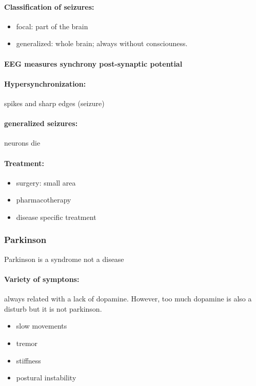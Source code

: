 \documentclass[12pt,article,oneside,a4paper]{memoir}
\begin{document}
\paragraph{Classification of seizures:}
\begin{itemize}
\item focal: part of the brain
\item generalized: whole brain; always without consciouness.
\end{itemize}

\paragraph{EEG measures synchrony post-synaptic potential}

\paragraph{Hypersynchronization:} spikes and sharp edges (seizure)
\paragraph{generalized seizures:} neurons die

\paragraph{Treatment:}
\begin{itemize}
\item surgery: small area
\item pharmacotherapy
\item disease specific treatment
\end{itemize}

\subsubsection{Parkinson}
Parkinson is a syndrome not a disease
\paragraph{Variety of symptons:} always related with a lack of dopamine. However, too much dopamine is also a disturb but it is not parkinson.
\begin{itemize}
\item slow movements
\item tremor
\item stiffness
\item postural instability
\end{itemize}
\end{document}
